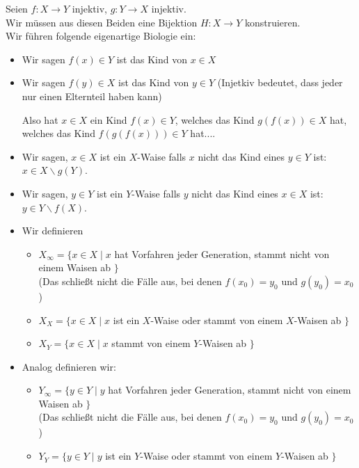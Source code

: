 \documentclass[main.tex]{subfiles}
\begin{document}
\begin{Beweis}
  Seien $f:X\to Y$ injektiv, $g:Y\to X$ injektiv.\\
  Wir müssen aus diesen Beiden eine Bijektion $H:X\to Y$ konstruieren.\\
  Wir führen folgende eigenartige Biologie ein:\\
  \begin{itemize}
    \item Wir sagen $f(x)\in Y$ ist das Kind von $x\in X$
    \item Wir sagen $f(y)\in X$ ist das Kind von $y\in Y$
    (Injetkiv bedeutet, dass jeder nur einen Elternteil haben kann)\\
    \begin{Bemerkung}
      Also hat $x\in X$ ein Kind $f(x) \in Y$, welches das Kind $g(f(x))\in X$ hat, welches das Kind $f(g(f(x))) \in Y$ hat....
    \end{Bemerkung}
    \item Wir sagen, $x\in X$ ist ein $X$-Waise falls $x$ nicht das Kind eines $y\in Y $ ist: $x\in X \backslash g(Y)$.
    \item Wir sagen, $y\in Y$ ist ein $Y$-Waise falls $y$ nicht das Kind eines $x \in X $ ist: $y\in Y \backslash f(X)$.
    \item Wir definieren
    \begin{itemize}
      \item $X_\infty = \{ x\in X \mid x $ hat Vorfahren jeder Generation, stammt nicht von einem Waisen ab $\}$\\
      (Das schließt nicht die Fälle aus, bei denen $f(x_0)=y_0$ und $g(y_0)=x_0$)
      \item $X_X = \{ x\in X \mid x$ ist ein $X$-Waise oder stammt von einem $X$-Waisen ab $\}$
      \item $X_Y = \{ x\in X \mid x$ stammt von einem $Y$-Waisen ab $\}$\\
    \end{itemize}
    \item Analog definieren wir:
    \begin{itemize}
      \item $Y_\infty = \{ y\in Y \mid y $ hat Vorfahren jeder Generation, stammt nicht von einem Waisen ab $\}$\\
      (Das schließt nicht die Fälle aus, bei denen $f(x_0)=y_0$ und $g(y_0)=x_0$)
      \item $Y_Y = \{ y \in Y \mid y$ ist ein $Y$-Waise oder stammt von einem $Y$-Waisen ab $\}$

\end{itemize}
\end{itemize}
\end{Beweis}
\end{document}
